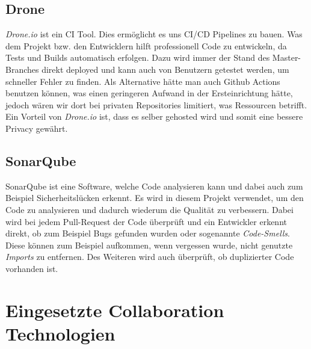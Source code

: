 \subsection{Drone}
    \textit{Drone.io} ist ein \ac{CI} Tool. Dies ermöglicht es uns \ac{CI/CD} Pipelines zu bauen. Was dem Projekt bzw. den Entwicklern hilft professionell Code zu entwickeln, da Tests und Builds automatisch erfolgen.
    Dazu wird immer der Stand des Master-Branches direkt deployed und kann auch von Benutzern getestet werden, um schneller Fehler zu finden. Als Alternative hätte man auch Github Actions benutzen können, was einen geringeren
    Aufwand in der Ersteinrichtung hätte, jedoch wären wir dort bei privaten Repositories limitiert, was Ressourcen betrifft. Ein Vorteil von \textit{Drone.io} ist, dass es selber gehosted wird und somit eine bessere Privacy gewährt.
\subsection{SonarQube}
    SonarQube ist eine Software, welche Code analysieren kann und dabei auch zum Beispiel Sicherheitslücken erkennt.
    Es wird in diesem Projekt verwendet, um den Code zu analysieren und dadurch wiederum die Qualität zu verbessern.
    Dabei wird bei jedem Pull-Request der Code überprüft und ein Entwickler erkennt direkt, ob zum Beispiel Bugs gefunden wurden oder sogenannte \textit{Code-Smells}. 
    Diese können zum Beispiel aufkommen, wenn vergessen wurde, nicht genutzte \textit{Imports} zu entfernen.
    Des Weiteren wird auch überprüft, ob duplizierter Code vorhanden ist.

\section{Eingesetzte Collaboration Technologien} 
